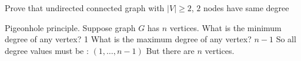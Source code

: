 \question Prove that undirected connected graph with $|V| \geq 2$, 
$2$ nodes have same degree
\begin{solution}
Pigeonhole principle. Suppose graph $G$ has $n$ vertices.
What is the minimum degree of any vertex? 1
What is the maximum degree of any vertex? $n - 1$
So all degree values must be : $(1, \dotsc, n - 1)$
But there are $n$ vertices.
\end{solution}

\clearpage
